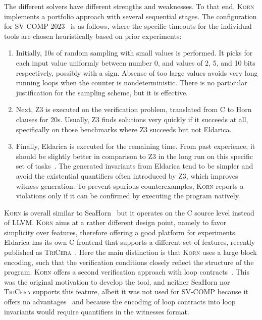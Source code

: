 \documentclass{llncs}
\newcommand{\Korn}{\textsc{Korn}\xspace}
\begin{document}
The different solvers have different strengths and weaknesses.
To that end, \Korn implements a portfolio approach with several sequential stages.
The configuration for SV-COMP 2023~\cite{SVCOMP23} is as follows,
where the specific timeouts for the individual tools are chosen heuristically based
on prior experiments:
\begin{enumerate}
    \item Initially, 10s of random sampling with small values is performed.
          It picks for each input value uniformly between number 0, and values of 2, 5, and 10 bits respectively, possibly with a sign.
          Absense of too large values avoids very long running loops
          when the counter is nondeterministic.
          There is no particular justification for the sampling scheme,
          but it is effective.
    \item Next, Z3 is executed on the verification problem, translated from C to Horn clauses for 20s. Usually, Z3 finds solutions very quickly if it succeeds at all,
          specifically on those benchmarks where Z3 succeeds but not Eldarica.
    \item Finally, Eldarica is executed for the remaining time.
          From past experience, it should be slightly better in comparison to Z3 in the long run on this specific set of tasks~\cite{ernst:arxiv2020:summaries}.
    The generated invariants from Eldarica tend to be simpler and avoid the existential quantifiers
    often introduced by Z3, which improves witness generation.
    To prevent spurious counterexamples,
    \Korn reports a violations only if it can be confirmed by executing the program natively.
\end{enumerate}
\Korn is overall similar to SeaHorn~\cite{gurfinkel2015seahorn} but it operates on the C source level instead of LLVM.
\Korn aims at a rather different design point, namely to favor simplicity over features, therefore offering a good platform for experiments.
Eldarica has its own C frontend that supports a different set of features,
recently published as \textsc{TriCera}~\cite{esen2022tricera}.
Here the main distinction is that \Korn uses a large block encoding,
such that the verification conditions closely reflect the structure of the program.
\Korn offers a second verification approach with loop contracts~\cite{tuerk2010local,hehner2005specified,ernst:vmcai2022}.
This was the original motivation to develop the tool, and neither
SeaHorn nor \textsc{TriCera} supports this feature,
albeit it was not used for SV-COMP because
it offers no advantages~\cite{ernst:arxiv2020:summaries}
and because the encoding of loop contracts into loop invariants would require quantifiers in the witnesses format.
\end{document}
